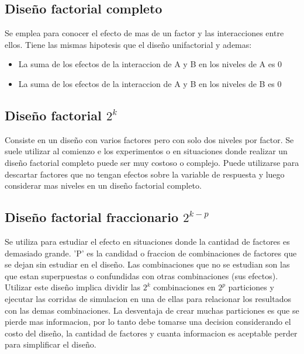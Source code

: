 \documentclass[a4paper]{article}
\begin{document}
\subsection*{Diseño factorial completo}
Se emplea para conocer el efecto de mas de un factor y las interacciones entre ellos.
Tiene las mismas hipotesis que el diseño unifactorial y ademas:
\begin{itemize}
    \item La suma de los efectos de la interaccion de A y B en los niveles de A es 0
    \item La suma de los efectos de la interaccion de A y B en los niveles de B es 0
\end{itemize}

\subsection*{Diseño factorial $2^k$}
Consiste en un diseño con varios factores pero con solo dos niveles por factor. 
Se suele utilizar al comienzo e los experimentos o en situaciones donde realizar un 
diseño factorial completo puede ser muy costoso o complejo. Puede utilizarse para descartar 
factores que no tengan efectos sobre la variable de respuesta y luego considerar mas niveles 
en un diseño factorial completo.

\subsection*{Diseño factorial fraccionario $2^{k-p}$}
Se utiliza para estudiar el efecto en situaciones donde la cantidad de factores es demasiado
grande. 'P' es la candidad o fraccion de combinaciones de factores que se dejan sin estudiar 
en el diseño.
Las combinaciones que no se estudian son las que estan superpuestas o confundidas con otras 
combinaciones (sus efectos).
Utilizar este diseño implica dividir las $2^k$ combinaciones en $2^p$ particiones y ejecutar 
las corridas de simulacion en una de ellas para relacionar los resultados con las demas combinaciones.
La desventaja de crear muchas particiones es que se pierde mas informacion, por lo tanto debe 
tomarse una decision considerando el costo del diseño, la cantidad de factores y cuanta informacion 
es aceptable perder para simplificar el diseño.
\end{document}
